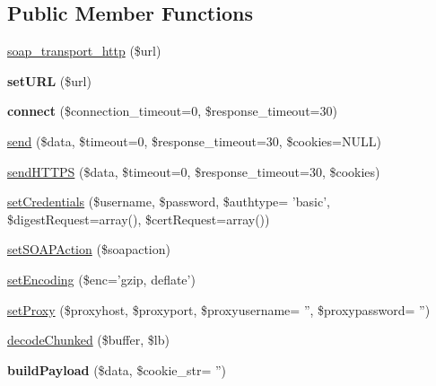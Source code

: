 \subsection*{Public Member Functions}
\begin{DoxyCompactItemize}
\item 
\hyperlink{classsoap__transport__http_afcc6a2b2fc19a97a2e192670fc8feb77}{soap\-\_\-transport\-\_\-http} (\$url)
\item 
\hypertarget{classsoap__transport__http_a5a4415db7a7e36f85a4d975c892b0470}{{\bfseries set\-U\-R\-L} (\$url)}\label{classsoap__transport__http_a5a4415db7a7e36f85a4d975c892b0470}

\item 
\hypertarget{classsoap__transport__http_a8648865ea5c701e29c03c79af40a7ffc}{{\bfseries connect} (\$connection\-\_\-timeout=0, \$response\-\_\-timeout=30)}\label{classsoap__transport__http_a8648865ea5c701e29c03c79af40a7ffc}

\item 
\hyperlink{classsoap__transport__http_a124252f4e9d206d86fcd6522854eb919}{send} (\$data, \$timeout=0, \$response\-\_\-timeout=30, \$cookies=N\-U\-L\-L)
\item 
\hyperlink{classsoap__transport__http_aa93a72fdc90b3535f17d471b7ccc3ffd}{send\-H\-T\-T\-P\-S} (\$data, \$timeout=0, \$response\-\_\-timeout=30, \$cookies)
\item 
\hyperlink{classsoap__transport__http_afc1032cca5010f0fefba2f0d5a9c4520}{set\-Credentials} (\$username, \$password, \$authtype= 'basic', \$digest\-Request=array(), \$cert\-Request=array())
\item 
\hyperlink{classsoap__transport__http_a792db42ef189835b80389a838fbf2cef}{set\-S\-O\-A\-P\-Action} (\$soapaction)
\item 
\hyperlink{classsoap__transport__http_a9dde5d06442abd355db3acbde021121d}{set\-Encoding} (\$enc='gzip, deflate')
\item 
\hyperlink{classsoap__transport__http_a07092d2bf7866cbb464ec98726ccc75a}{set\-Proxy} (\$proxyhost, \$proxyport, \$proxyusername= '', \$proxypassword= '')
\item 
\hyperlink{classsoap__transport__http_a6dc9ad42ffb3aaea279c0ee16c4068b2}{decode\-Chunked} (\$buffer, \$lb)
\item 
\hypertarget{classsoap__transport__http_a3aaa5b45b7d75364bccaf3918a5ce908}{{\bfseries build\-Payload} (\$data, \$cookie\-\_\-str= '')}\label{classsoap__transport__http_a3aaa5b45b7d75364bccaf3918a5ce908}


\end{DoxyCompactItemize}
